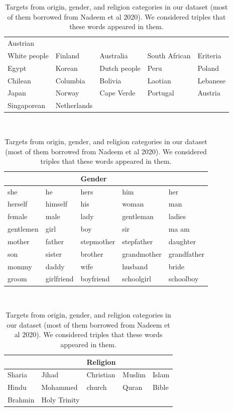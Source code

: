 \begin{table}[h!]
\begin{minipage}{.5\textwidth}
\begin{tabular}{ p{2.9cm} p{2.9cm} p{2.4cm} p{2.4cm} p{3cm}}
Austrian \\ White people& Finland& Australia& South African& Eriteria \\
Egypt& Korean& Dutch people& Peru& Poland \\ Chilean&
Columbia& Bolivia& Laotian& Lebanese \\ Japan& Norway&
Cape Verde& Portugal& Austria \\ Singaporean& Netherlands
 \\[0.5pt]
  \bottomrule
\end{tabular}
\\[0.5pt]
\end{minipage}%

\begin{minipage}{.45\textwidth}
\begin{tabular}{ p{2.9cm} p{2.9cm} p{2.4cm} p{2.4cm} p{3cm} }
 \toprule
 &&Gender&&\\
 \midrule
she&he&hers&him&her \\herself& himself& his&woman&man \\female&male&lady&gentleman&ladies \\gentlemen&girl&boy &sir& ma am \\mother&father&stepmother&stepfather&daughter \\ son&sister& brother&  grandmother&   grandfather  \\
  mommy& daddy&wife&husband&bride \\ groom&girlfriend& boyfriend&schoolgirl & schoolboy  \\[0.5pt]
  \bottomrule
\end{tabular}
\\[0.5pt]
\end{minipage}%

\begin{minipage}{.45\textwidth}
\begin{tabular}{ p{2.9cm} p{2.9cm} p{2.4cm} p{2.4cm} p{3cm} }
 \toprule
 &&Religion&&\\
 \midrule
Sharia& Jihad& Christian& Muslim& Islam \\ Hindu&
Mohammed& church&  Quran&Bible \\Brahmin&Holy Trinity  \\[0.5pt]
  \bottomrule
\end{tabular}
\\[0.5pt]
\end{minipage}%

\caption{Targets from origin, gender, and religion categories in our dataset (most of them borrowed from Nadeem et al 2020). We considered triples that these words appeared in them.}
    \label{stereoset_groups_conceptnet}
\end{table}



